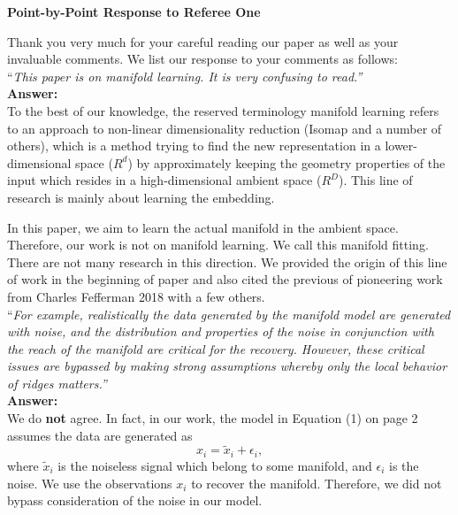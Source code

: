 \documentclass[12pt]{article}
\begin{document}

\begin{center}
{\bf \large Point-by-Point Response to Referee One}
\end{center}
Thank you very much for your careful reading our paper as well as your invaluable comments. We list our response to your comments as follows:\\ 

\noindent ``\textit {This paper is on manifold learning.  It is very confusing to read.''}\\

{\bf Answer:}\\

To the best of our knowledge, the reserved terminology manifold learning refers to an approach to non-linear dimensionality reduction (Isomap and a number of others), which is a method trying to find the new representation in a lower-dimensional space ($R^d$) by approximately keeping the geometry properties of the input which resides in a high-dimensional ambient space ($R^D$). This line of research is mainly about learning the embedding. 

In this paper, we aim to learn the actual manifold in the ambient space. Therefore, our work is not on manifold learning. We call this manifold fitting. There are not many research in this direction. We provided the origin of this line of work in the beginning of paper and also cited the previous of pioneering work from Charles Fefferman 2018 with a few others. \\ 




\noindent ``\textit{For example, realistically the data generated by the manifold model are generated with noise, and the distribution and properties of the noise in conjunction with the reach of the manifold are critical for the recovery. However, these critical issues are bypassed by making strong assumptions whereby only the local behavior of ridges matters.''}\\

{\bf Answer:}\\
We do {\bf not} agree. In fact, in our work, the model in Equation (1) on page 2 assumes the data are generated as 
\begin{equation}\label{model}
x_i=\tilde{x}_i+\epsilon_i,
\end{equation}
where $\tilde{x}_i$ is the noiseless signal which belong to some manifold, and $\epsilon_i$ is the noise. We use the observations $x_i$ to recover the manifold. Therefore, we did not bypass consideration of the noise in our model.\\
\end{document}
